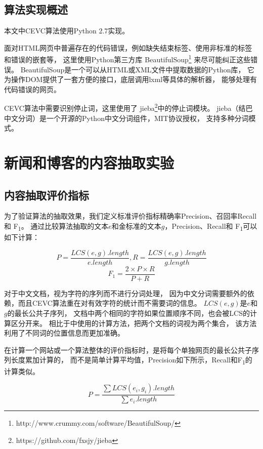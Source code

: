 \subsection{算法实现概述}
本文中CEVC算法使用Python 2.7实现。

面对HTML网页中普遍存在的代码错误，例如缺失结束标签、使用非标准的标签和错误的嵌套等，
这里使用Python第三方库
BeautifulSoup\footnote{http://www.crummy.com/software/BeautifulSoup/}
来尽可能纠正这些错误。
BeautifulSoup是一个可以从HTML或XML文件中提取数据的Python库，
它为操作DOM提供了一套方便的接口，底层调用lxml等具体的解析器，
能够处理有代码错误的网页。

CEVC算法中需要识别停止词，这里使用了
jieba\footnote{https://github.com/fxsjy/jieba}中的停止词模块。
jieba（结巴中文分词）是一个开源的Python中文分词组件，MIT协议授权，
支持多种分词模式。

\section{新闻和博客的内容抽取实验}
\label{sec:cevc-experiment}

\subsection{内容抽取评价指标}
为了验证算法的抽取效果，我们定义标准评价指标精确率Precision、召回率Recall和
F\textsubscript{1}。
通过比较算法抽取的文本$e$和金标准的文本$g$，Precision、Recall和
F\textsubscript{1}可以如下计算：

\begin{equation}
P = \frac{LCS(e,g).length}{e.length}, R = \frac{LCS(e,g).length}{g.length}
\end{equation}
\begin{equation}
F_1 = \frac{2 \times P \times R}{P + R}
\end{equation}

对于中文文档，视为字符的序列而不进行分词处理，
因为中文分词需要额外的依赖，而且CEVC算法重在对有效字符的统计而不需要词的信息。
$LCS(e,g)$是$e$和$g$的最长公共子序列，
文档中两个相同的字符如果位置顺序不同，也会被LCS的计算区分开来。
相比于\cite{weninger2010cetr}中使用的计算方法，把两个文档的词视为两个集合，
该方法利用了不同词的位置信息而更加准确。

在计算一个网站或一个算法整体的评价指标时，是将每个单独网页的最长公共子序列长度累加计算的，
而不是简单计算平均值，Precision如下所示，Recall和F\textsubscript{1}的计算类似。

\begin{equation}
P = \frac{\sum LCS(e_i,g_i).length}{\sum e_i.length}
\end{equation}

